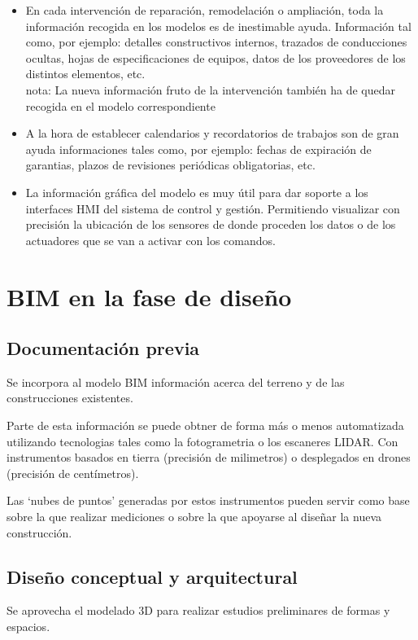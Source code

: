 \documentclass[spanish,12pt,a4paper,final,oneside]{book}
\begin{document}
\begin{enumerate}
\begin{itemize}
\item En cada intervención de reparación, remodelación o ampliación, toda la información recogida en los modelos es de inestimable ayuda. Información tal como, por ejemplo: detalles constructivos internos, trazados de conducciones ocultas, hojas de especificaciones de equipos, datos de los proveedores de los distintos elementos, etc.
\\nota: La nueva información fruto de la intervención también ha de quedar recogida en el modelo correspondiente

\item A la hora de establecer calendarios y recordatorios de trabajos son de gran ayuda informaciones tales como, por ejemplo: fechas de expiración de garantias, plazos de revisiones periódicas obligatorias, etc. 

\item La información gráfica del modelo es muy útil para dar soporte a los interfaces HMI del sistema de control y gestión. Permitiendo visualizar con precisión la ubicación de los sensores de donde proceden los datos o de los actuadores que se van a activar con los comandos.


\end{itemize}

\end{enumerate}

\chapter{BIM en la fase de diseño}

\section{Documentación previa}
Se incorpora al modelo BIM información acerca del terreno y de las construcciones existentes. 

Parte de esta información se puede obtner de forma más o menos automatizada utilizando tecnologias tales como la fotogrametria o los escaneres LIDAR. Con instrumentos basados en tierra (precisión de milimetros) o desplegados en drones (precisión de centímetros).

Las ‘nubes de puntos’ generadas por estos instrumentos pueden servir como base sobre la que realizar mediciones o sobre la que apoyarse al diseñar la nueva construcción.

\section{Diseño conceptual y arquitectural}
Se aprovecha el modelado 3D para realizar estudios preliminares de formas y espacios.
\end{document}
